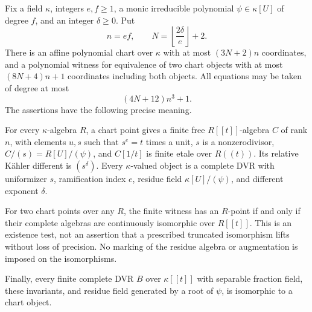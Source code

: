 \begin{proposition}
\label{D:sparse-DVR-linear-atlas}
Fix a field $\kappa$, integers $e,f\ge1$, a monic irreducible
polynomial $\psi\in\kappa[U]$ of degree $f$, and an integer
$\delta\ge0$.  Put
\[
 n=ef,\qquad N=\left\lfloor\frac{2\delta}{e}\right\rfloor+2.
                                                        \tag{D.SD.1}
\]
There is an affine polynomial chart over $\kappa$ with at most
$(3N+2)n$ coordinates, and a polynomial witness for equivalence
of two chart objects with at most $(8N+4)n+1$ coordinates
including both objects.  All equations may be taken of degree
at most
\[
                         (4N+12)n^3+1.                 \tag{D.SD.2}
\]
The assertions have the following precise meaning.

For every $\kappa$-algebra $R$, a chart point gives a finite free
$R[[t]]$-algebra $C$ of rank $n$, with elements $u,s$ such that
$s^e=t$ times a unit, $s$ is a nonzerodivisor,
$C/(s)=R[U]/(\psi)$, and $C[1/t]$ is finite etale over
$R((t))$.  Its relative K\"ahler different is $(s^\delta)$.
Every $\kappa$-valued object is a complete DVR with uniformizer
$s$, ramification index $e$, residue field $\kappa[U]/(\psi)$,
and different exponent $\delta$.

For two chart points over any $R$, the finite witness has an
$R$-point if and only if their complete algebras are continuously
isomorphic over $R[[t]]$.  This is an existence test, not an
assertion that a prescribed truncated isomorphism lifts without
loss of precision.  No marking of the residue algebra or
augmentation is imposed on the isomorphisms.

Finally, every finite complete DVR $B$ over $\kappa[[t]]$ with
separable fraction field, these invariants, and residue field
generated by a root of $\psi$, is isomorphic to a chart object.
\end{proposition}

